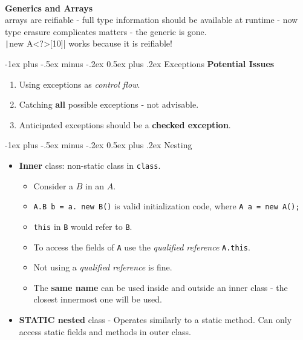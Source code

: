 \documentclass[10pt, landscape]{article}
\makeatletter
\renewcommand{\section}{\@startsection{section}{1}{0mm}%
                                {-1ex plus -.5ex minus -.2ex}%
                                {0.5ex plus .2ex}%
                                {\normalfont\large\bfseries}}
\newcommand{\code}[1]{\textcolor{mygreen}{\texttt{#1}}}
\newcommand{\java}[1]{\texttt|#1|}
\makeatother
\begin{document}
\begin{multicols}{2}
\\
\vspace{2 pt}
\textbf{Generics and Arrays \\}
arrays are reifiable - full type information should be available at runtime - now type erasure complicates matters - the generic is gone.
\\ \java{new A<?>[10]} works because it is reifiable!

\section{Exceptions}
\textbf{Potential Issues}
\begin{enumerate}
    \item Using exceptions as \textit{control flow}.
    \item Catching \textbf{all} possible exceptions - not advisable.
    \item Anticipated exceptions should be a \textbf{checked exception}.
\end{enumerate}

\section{Nesting}
\begin{itemize}
    \item \textbf{Inner} class: non-static class in \code{class}. 
    \begin{itemize}
        \item Consider a $B$ in an $A$.
        \item \code{A.B b = a. new B()} is valid initialization code, where \code{A a = new A();}
        \item \code{this} in \code{B} would refer to \code{B}.
        \item To access the fields of \code{A} use the \textit{qualified reference} \code{A.this}.
        \item Not using a \textit{qualified reference} is fine.
        \item The \textbf{same name} can be used inside and outside an inner class - the closest innermost one will be used. 
    \end{itemize}
    \vspace{2 pt}
    \item \textbf{STATIC nested} class - Operates similarly to a static method. Can only access static fields and methods in outer class. 


\end{itemize}
\end{multicols}
\end{document}
